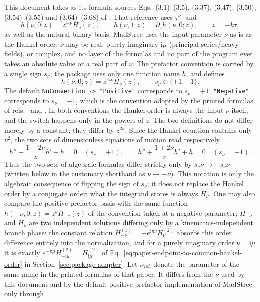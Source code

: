 \documentclass[11pt,a4paper]{article}
\newcommand{\ii}{\mathrm i}
\begin{document}
This document takes as its formula sources Eqs.~(3.1)--(3.5), (3.37), (3.47), (3.50), (3.54)--(3.55) and (3.64)--(3.68) of \cite{Chen:2023eic}. That reference uses $\tau^{\nu_0}$ and
\begin{equation}
 h(\nu,0;z)=z^{-\nu}H_{\nu}(z),
 \qquad
 h(\nu,1;z)=\partial_z h(\nu,0;z),
 \qquad z=-k\tau,
 \label{eq:paper-h-definition}
\end{equation}
as well as the natural binary basis. MadStree uses the input parameter $\nu$ as-is as the Hankel order: $\nu$ may be real, purely imaginary $\ii\mu$ (principal series/heavy fields), or complex, and no layer of the formulas and no part of the program ever takes an absolute value or a real part of $\nu$. The prefactor convention is carried by a single sign $s_\nu$; the package uses only one function name $h$, and defines
\begin{equation}
 \boxed{h(\nu,0;z)=z^{s_\nu\nu}H_\nu(z)},
 \qquad s_\nu\in\{+1,-1\}.
 \label{eq:positive-order-h}
\end{equation}
The default \texttt{NuConvention -> "Positive"} corresponds to $s_\nu=+1$; \texttt{"Negative"} corresponds to $s_\nu=-1$, which is the convention adopted by the printed formulas of refs.~\cite{Chen:2023eic} and \cite{Chen:2024jms}. In both conventions the Hankel order is always the input $\nu$ itself, and the switch happens only in the powers of $z$. The two definitions do not differ merely by a constant; they differ by $z^{2\nu}$. Since the Hankel equation contains only $\nu^2$, the two sets of dimensionless equations of motion read respectively
\begin{equation}
 h''+\frac{1-2\nu}{z}h'+h=0\quad(s_\nu=+1),
 \qquad
 h''+\frac{1+2\nu}{z}h'+h=0\quad(s_\nu=-1).
\end{equation}
Thus the two sets of algebraic formulas differ strictly only by $s_\nu\nu\to-s_\nu\nu$ (written below in the customary shorthand as $\nu\to-\nu$). This notation is only the algebraic consequence of flipping the sign of $s_\nu$; it does not replace the Hankel order by a conjugate order: what the integrand stores is always $H_\nu$. One may also compare the positive-prefactor basis with the same function $h(-\nu,0;z)=z^\nu H_{-\nu}(z)$ of the \cite{Chen:2023eic} convention taken at a negative parameter; $H_{-\nu}$ and $H_\nu$ are two independent solutions differing only by a kinematics-independent branch phase: the constant relation $H^{(1)}_{-\nu}=-e^{\ii\pi\nu}H^{(2)}_\nu$ absorbs this order difference entirely into the normalization, and for a purely imaginary order $\nu=\ii\mu$ it is exactly $e^{-\pi\mu}H^{(2)}_{-\ii\mu}=H^{(2)}_{\ii\mu}$ of Eq.~\eqref{eq:paper-endpoint-to-common-hankel-order} in Section~\ref{sec:package-adapter}. Let $\nu_{\rm ref}$ denote the parameter of the same name in the printed formulas of that paper. It differs from the $\nu$ used by this document and by the default positive-prefactor implementation of MadStree only through
\end{document}
